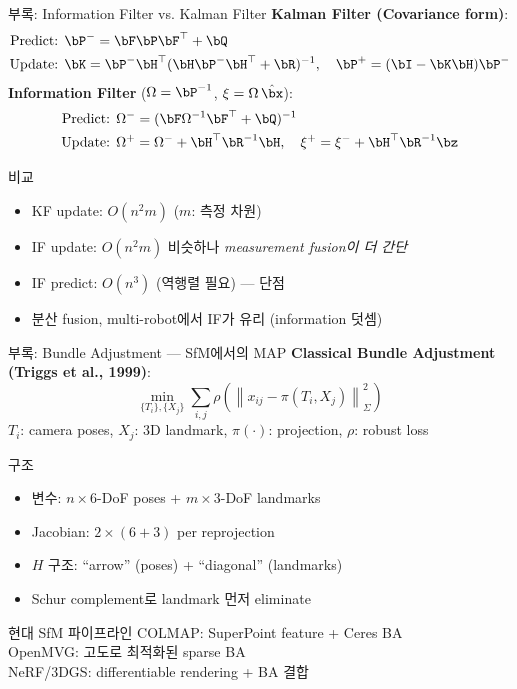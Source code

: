 \begin{frame}{부록: Information Filter vs. Kalman Filter}
  \textbf{Kalman Filter (Covariance form)}:
  \begin{align*}
    \text{Predict: }&\bP^- = \bF\bP\bF^\top + \bQ \\
    \text{Update: }&\bK = \bP^-\bH^\top(\bH\bP^-\bH^\top+\bR)^{-1},\quad
    \bP^+ = (\bI - \bK\bH)\bP^-
  \end{align*}
  \pause
  \textbf{Information Filter} ($\Omega = \bP^{-1}$, $\xi = \Omega\,\hat{\bx}$):
  \begin{align*}
    \text{Predict: }&\Omega^- = (\bF\Omega^{-1}\bF^\top + \bQ)^{-1} \\
    \text{Update: }&\Omega^+ = \Omega^- + \bH^\top\bR^{-1}\bH,\quad
    \xi^+ = \xi^- + \bH^\top\bR^{-1}\bz
  \end{align*}
  \pause
  \begin{block}{비교}
    \begin{itemize}
      \item KF update: $O(n^2 m)$ ($m$: 측정 차원)
      \item IF update: $O(n^2 m)$ 비슷하나 \emph{measurement fusion이 더 간단}
      \item IF predict: $O(n^3)$ (역행렬 필요) — 단점
      \item 분산 fusion, multi-robot에서 IF가 유리 (information 덧셈)
    \end{itemize}
  \end{block}
\end{frame}

\begin{frame}{부록: Bundle Adjustment — SfM에서의 MAP}
  \textbf{Classical Bundle Adjustment (Triggs et al., 1999)}:
  \[
    \min_{\{T_i\}, \{X_j\}} \sum_{i,j} \rho\!\left(\left\|x_{ij} - \pi(T_i, X_j)\right\|_{\Sigma}^2\right)
  \]
  $T_i$: camera poses, $X_j$: 3D landmark, $\pi(\cdot)$: projection, $\rho$: robust loss
  \pause
  \begin{block}{구조}
    \begin{itemize}
      \item 변수: $n \times 6$-DoF poses + $m \times 3$-DoF landmarks
      \item Jacobian: $2 \times (6+3)$ per reprojection
      \item $H$ 구조: ``arrow'' (poses) + ``diagonal'' (landmarks)
      \item Schur complement로 landmark 먼저 eliminate
    \end{itemize}
  \end{block}
  \pause
  \begin{exampleblock}{현대 SfM 파이프라인}
    COLMAP: SuperPoint feature + Ceres BA\\
    OpenMVG: 고도로 최적화된 sparse BA\\
    NeRF/3DGS: differentiable rendering + BA 결합
  \end{exampleblock}
\end{frame}

